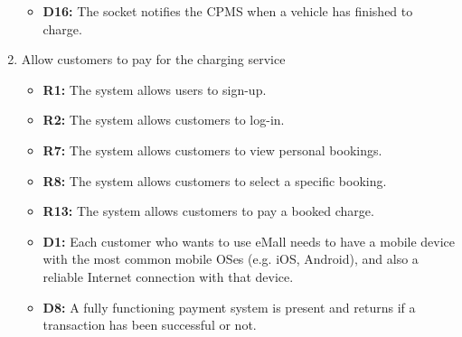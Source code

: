 \begin{enumerate}[label=\textbf{-G\arabic*}:]
{\begin{itemize}
            \item \textbf{D16:} The socket notifies the CPMS when a vehicle has finished to charge.
          \end{itemize}
          }
    \item {Allow customers to pay for the charging service
          \begin{itemize}
            \item \textbf{R1:} The system allows users to sign-up.
            \item \textbf{R2:} The system allows customers to log-in.
            \item \textbf{R7:} The system allows customers to view personal bookings.
            \item \textbf{R8:} The system allows customers to select a specific booking.
            \item \textbf{R13:} The system allows customers to pay a booked charge.
            \item \textbf{D1:} Each customer who wants to use eMall needs to have a mobile device with the most common mobile OSes (e.g. iOS, Android), and also a reliable Internet connection with that device.
            \item \textbf{D8:} A fully functioning payment system is present and returns if a transaction has been successful or not.
              
          \end{itemize}
          }
    

\end{enumerate}
